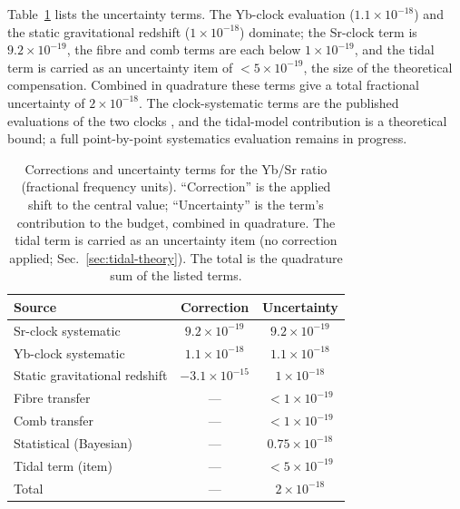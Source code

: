 \documentclass[11pt,a4paper]{article}
\newcommand{\e}[1]{\times 10^{#1}}
\begin{document}
Table~\ref{tab:budget} lists the uncertainty terms. The Yb-clock
evaluation \citep{zhu2026yb} ($1.1\e{-18}$) and the static gravitational
redshift ($1\e{-18}$) dominate; the Sr-clock term \citep{jia2026sr} is
$9.2\e{-19}$, the fibre and comb terms are each below $1\e{-19}$, and the
tidal term is carried as an uncertainty item of $<5\e{-19}$, the size of
the theoretical compensation. Combined in quadrature these terms give a
total fractional uncertainty of $2\e{-18}$. The clock-systematic terms
are the published evaluations of the two clocks \citep{zhu2026yb,
jia2026sr}, and the tidal-model contribution is a theoretical bound; a
full point-by-point systematics evaluation remains in progress.

\begin{table}[t]
  \centering
  \caption{Corrections and uncertainty terms for the Yb/Sr ratio
  (fractional frequency units). ``Correction'' is the applied shift to
  the central value; ``Uncertainty'' is the term's contribution to the
  budget, combined in quadrature. The tidal term is carried as an
  uncertainty item (no correction applied; Sec.~\ref{sec:tidal-theory}).
  The total is the quadrature sum of the listed terms.}
  \label{tab:budget}
  \begin{tabular}{lcc}
    \toprule
    Source & Correction & Uncertainty \\
    \midrule
    Sr-clock systematic      & $9.2\e{-19}$ & $9.2\e{-19}$ \\
    Yb-clock systematic      & $1.1\e{-18}$ & $1.1\e{-18}$ \\
    Static gravitational redshift & $-3.1\e{-15}$ & $1\e{-18}$ \\
    Fibre transfer           & --- & $<1\e{-19}$ \\
    Comb transfer            & --- & $<1\e{-19}$ \\
    Statistical (Bayesian)   & --- & $0.75\e{-18}$ \\
    Tidal term (item)        & --- & $<5\e{-19}$ \\
    \midrule
    Total                    & --- & $2\e{-18}$ \\
    \bottomrule
  \end{tabular}
\end{table}
\end{document}
